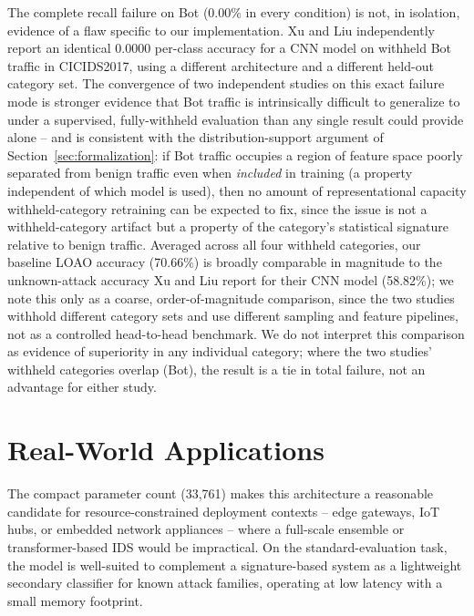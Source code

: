\documentclass[11pt]{article}
\begin{document}
The complete recall failure on Bot (0.00\% in every condition) is not, in isolation, evidence of a
flaw specific to our implementation. Xu and Liu \cite{xu2025} independently report an identical
0.0000 per-class accuracy for a CNN model on withheld Bot traffic in CICIDS2017, using a different
architecture and a different held-out category set. The convergence of two independent studies on
this exact failure mode is stronger evidence that Bot traffic is intrinsically difficult to
generalize to under a supervised, fully-withheld evaluation than any single result could provide
alone -- and is consistent with the distribution-support argument of Section~\ref{sec:formalization}:
if Bot traffic occupies a region of feature space poorly separated from benign traffic even when
\emph{included} in training (a property independent of which model is used), then no amount of
representational capacity withheld-category retraining can be expected to fix, since the issue is
not a withheld-category artifact but a property of the category's statistical signature relative to
benign traffic. Averaged across all four withheld categories, our baseline LOAO accuracy (70.66\%)
is broadly comparable in magnitude to the unknown-attack accuracy Xu and Liu report for their CNN
model (58.82\%); we note this only as a coarse, order-of-magnitude comparison, since the two studies
withhold different category sets and use different sampling and feature pipelines, not as a
controlled head-to-head benchmark. We do not interpret this comparison as evidence of superiority in
any individual category; where the two studies' withheld categories overlap (Bot), the result is a
tie in total failure, not an advantage for either study.

\section{Real-World Applications}
\label{sec:deployment}

The compact parameter count (33{,}761) makes this architecture a reasonable candidate for
resource-constrained deployment contexts -- edge gateways, IoT hubs, or embedded network appliances
-- where a full-scale ensemble or transformer-based IDS would be impractical. On the
standard-evaluation task, the model is well-suited to complement a signature-based system as a
lightweight secondary classifier for known attack families, operating at low latency with a small
memory footprint.
\end{document}
